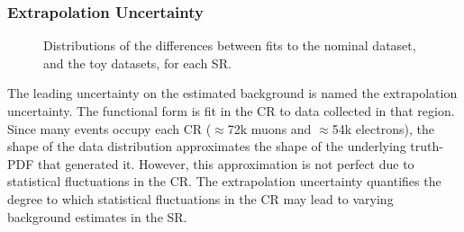 \subsubsection{Extrapolation Uncertainty}
\begin{figure}[h!]
\captionsetup[subfigure]{position=b}
\centering
{} 
\caption{Distributions of the differences between fits to the nominal dataset, and the toy datasets, for each SR.}
\label{fig:ciBkgEuSyst}
\end{figure}

The leading uncertainty on the estimated background is named the extrapolation uncertainty.
The functional form is fit in the CR to data collected in that region.
Since many events occupy each CR ($\approx$72k muons and $\approx$54k electrons), the shape of the \mll data distribution approximates the shape of the underlying truth-PDF that generated it.
However, this approximation is not perfect due to statistical fluctuations in the CR.
The extrapolation uncertainty quantifies the degree to which statistical fluctuations in the CR may lead to varying background estimates in the SR.

